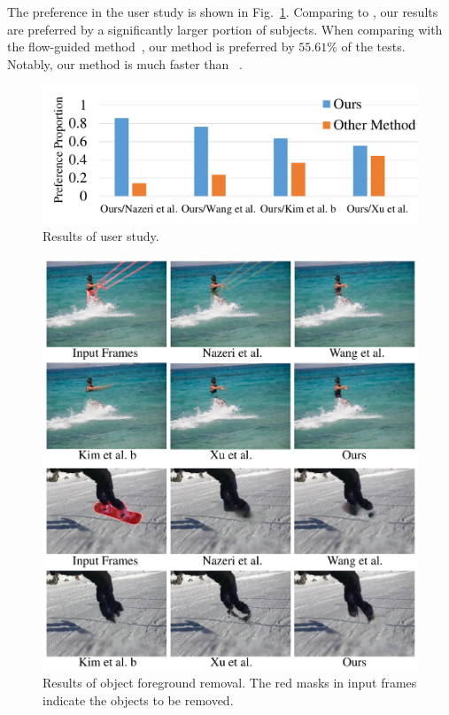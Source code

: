 The preference in the user study is shown in Fig.~\ref{userstudy}. 
Comparing to \cite{nazeri2019edgeconnect,wang2019video,Kim_2019_CVPR1}, our results are preferred by a significantly larger portion of subjects.
%
When comparing with the flow-guided method~\cite{Xu_2019_CVPR}, our method is preferred by $55.61\%$ of the tests. 
Notably, our method is much faster than ~\cite{Xu_2019_CVPR}.
%
\begin{figure}[!t]
	\centering
	\includegraphics[width=1.0\columnwidth]{userstudy} %
	\caption{Results of user study.}
	\label{userstudy}
\end{figure}
%
\begin{figure}[!h]
	\centering
	\includegraphics[width=1.0\columnwidth]{vis_forg} %
	\caption{Results of object foreground removal. The red masks in input frames indicate the objects to be removed.}
	\label{vis_forg}
\end{figure}
